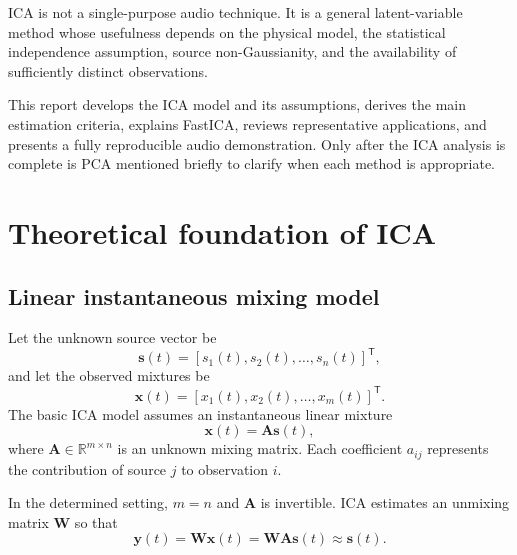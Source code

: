 \documentclass[
    paper=a4,
    fontsize=11pt,
    DIV=11,
    parskip=half,
    headings=normal,
    numbers=noendperiod,
    abstract=true,
    titlepage=true
]{scrartcl}
\begin{document}
ICA is not a single-purpose audio technique. It is a general latent-variable method whose usefulness depends on the physical model, the statistical independence assumption, source non-Gaussianity, and the availability of sufficiently distinct observations.

This report develops the ICA model and its assumptions, derives the main estimation criteria, explains FastICA, reviews representative applications, and presents a fully reproducible audio demonstration. Only after the ICA analysis is complete is PCA mentioned briefly to clarify when each method is appropriate.

\section{Theoretical foundation of ICA}

\subsection{Linear instantaneous mixing model}

Let the unknown source vector be
\begin{equation}
    \mathbf{s}(t)=[s_1(t),s_2(t),\ldots,s_n(t)]^{\mathsf T},
\end{equation}
and let the observed mixtures be
\begin{equation}
    \mathbf{x}(t)=[x_1(t),x_2(t),\ldots,x_m(t)]^{\mathsf T}.
\end{equation}
The basic ICA model assumes an instantaneous linear mixture
\begin{equation}
    \mathbf{x}(t)=\mathbf{A}\mathbf{s}(t),
    \label{eq:mixing}
\end{equation}
where $\mathbf{A}\in\mathbb{R}^{m\times n}$ is an unknown mixing matrix. Each coefficient $a_{ij}$ represents the contribution of source $j$ to observation $i$.

In the determined setting, $m=n$ and $\mathbf{A}$ is invertible. ICA estimates an unmixing matrix $\mathbf{W}$ so that
\begin{equation}
    \mathbf{y}(t)=\mathbf{W}\mathbf{x}(t)
    =\mathbf{W}\mathbf{A}\mathbf{s}(t)\approx\mathbf{s}(t).
    \label{eq:unmixing}
\end{equation}
\end{document}
